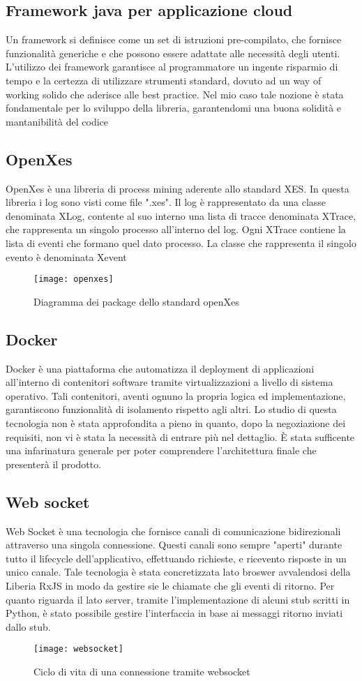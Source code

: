 \subsection{Framework java per applicazione cloud}
Un framework si definisce come un set di istruzioni pre-compilato, che fornisce funzionalità
generiche e che possono essere adattate alle necessità degli utenti. 
L’utilizzo dei framework garantisce al programmatore un ingente
risparmio di tempo e la certezza di utilizzare strumenti standard, dovuto ad un way
of working solido che aderisce alle best practice. Nel mio caso tale nozione è stata fondamentale per lo sviluppo della libreria, garantendomi una buona solidità e mantanibilità del codice
\subsection{OpenXes}
OpenXes è una libreria di process mining aderente allo standard XES. In questa libreria i log sono visti come file ".xes". Il log è rappresentato da una classe denominata XLog, contente al suo interno una lista di tracce denominata XTrace, che rappresenta un singolo processo all'interno del log. Ogni XTrace contiene la lista di eventi che formano quel dato processo. La classe che rappresenta il singolo evento è denominata Xevent
\begin{figure}[!h] 
	\centering 
	\texttt{[image: openxes]} 
	\caption{Diagramma dei package dello standard openXes}
\end{figure}
\subsection{Docker}
Docker è una piattaforma che automatizza il deployment di applicazioni all'interno di contenitori software tramite virtualizzazioni a livello di sistema operativo. Tali contenitori, aventi ognuno la propria logica ed implementazione, garantiscono funzionalità di isolamento rispetto agli altri. Lo studio di questa tecnologia non è stata approfondita a pieno in quanto, dopo la negoziazione dei requisiti, non vi è stata la necessità di entrare più nel dettaglio. È stata sufficente una infarinatura generale per poter comprendere l'architettura finale che presenterà il prodotto. 
\subsection{Web socket}
Web Socket è una tecnologia che fornisce canali di comunicazione bidirezionali attraverso una singola connessione. Questi canali sono sempre "aperti" durante tutto il lifecycle dell'applicativo, effettuando richieste, e ricevento risposte in un unico canale. Tale tecnologia è stata concretizzata lato broswer avvalendosi della Liberia RxJS in modo da gestire sie le chiamate che gli eventi di ritorno. Per quanto riguarda il lato server, tramite l'implementazione di alcuni stub scritti in Python, è stato possibile gestire l'interfaccia in base ai messaggi ritorno inviati dallo stub.
\begin{figure}[!h] 
	\centering 
	\texttt{[image: websocket]} 
	\caption{Ciclo di vita di una connessione tramite websocket}
\end{figure}
